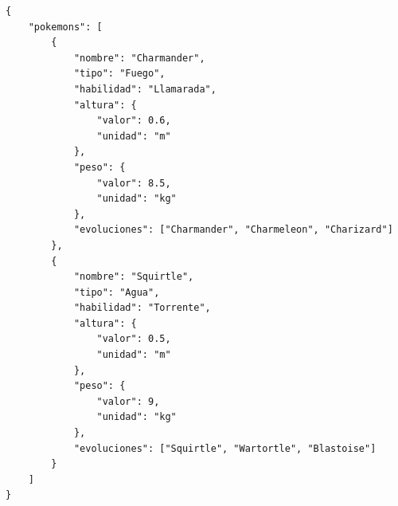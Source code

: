 \documentclass[12pt,a4paper,addpoints,answers]{exam}
\begin{document}
\begin{questions}
\begin{solution}
\begin{verbatim}
{
    "pokemons": [
        {
            "nombre": "Charmander",
            "tipo": "Fuego",
            "habilidad": "Llamarada",
            "altura": {
                "valor": 0.6,
                "unidad": "m"
            },
            "peso": {
                "valor": 8.5,
                "unidad": "kg"
            },
            "evoluciones": ["Charmander", "Charmeleon", "Charizard"]
        },
        {
            "nombre": "Squirtle",
            "tipo": "Agua",
            "habilidad": "Torrente",
            "altura": {
                "valor": 0.5,
                "unidad": "m"
            },
            "peso": {
                "valor": 9,
                "unidad": "kg"
            },
            "evoluciones": ["Squirtle", "Wartortle", "Blastoise"]
        }
    ]
}
\end{verbatim}
\end{solution}
\end{questions}
\end{document}
